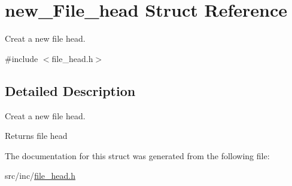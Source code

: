 \hypertarget{structnew___file__head}{}\section{new\+\_\+\+File\+\_\+head Struct Reference}
\label{structnew___file__head}


Creat a new file head.  




{\ttfamily \#include $<$file\+\_\+head.\+h$>$}



\subsection{Detailed Description}
Creat a new file head. 

\begin{DoxyReturn}{Returns}
file head 
\end{DoxyReturn}


The documentation for this struct was generated from the following file\+:\begin{DoxyCompactItemize}
\item 
src/inc/\mbox{\hyperlink{file__head_8h}{file\+\_\+head.\+h}}\end{DoxyCompactItemize}

